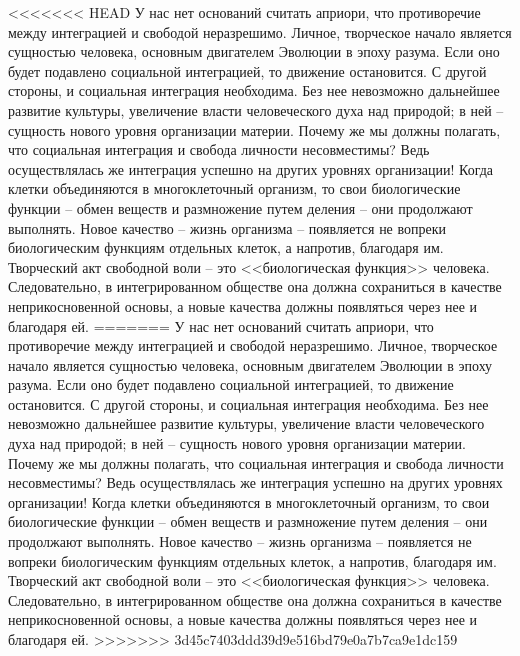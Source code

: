 \documentclass{book}
\begin{document}
<<<<<<< HEAD
У нас нет оснований считать априори, что противоречие между интеграцией и свободой неразрешимо. Личное, творческое начало является сущностью человека, основным двигателем Эволюции в эпоху разума. Если оно будет подавлено социальной интеграцией, то движение остановится. С другой стороны, и социальная интеграция необходима. Без нее невозможно дальнейшее развитие культуры, увеличение власти человеческого духа над природой; в ней -- сущность нового уровня организации материи. Почему же мы должны полагать, что социальная интеграция и свобода личности несовместимы? Ведь осуществлялась же интеграция успешно на других уровнях организации! Когда клетки объединяются в многоклеточный организм, то свои биологические функции -- обмен веществ и размножение путем деления -- они продолжают выполнять. Новое качество -- жизнь организма -- появляется не вопреки биологическим функ­циям отдельных клеток, а напротив, благодаря им. Творческий акт свободной воли -- это <<биологическая функция>> человека. Следовательно, в интегрированном обществе она должна сохраниться в качестве неприкосновенной основы, а новые ка­чества должны появляться через нее и благодаря ей.
=======
У нас нет оснований считать априори, что противоречие между интеграцией и свободой неразрешимо. Личное, творческое начало является сущностью человека, основным двигателем Эволюции в эпоху разума. Если оно будет подавлено социальной интеграцией, то движение остановится. С другой стороны, и социальная интеграция необходима. Без нее невозможно дальнейшее развитие культуры, увеличение власти человеческого духа над природой; в ней -- сущность нового уровня организации материи. Почему же мы должны полагать, что социальная интеграция и свобода личности несовместимы? Ведь осуществлялась же интеграция успешно на других уровнях организации! Когда клетки объединяются в многоклеточный организм, то свои биологические функции -- обмен веществ и размножение путем деления -- они продолжают выполнять. Новое качество -- жизнь организма -- появляется не вопреки биологическим функ­циям отдельных клеток, а напротив, благодаря им. Творческий акт свободной воли -- это <<биологическая функция>> человека. Следовательно, в 
интегрированном обществе она должна сохраниться в качестве неприкосновенной основы, а новые ка­чества должны появляться через нее и благодаря ей.
>>>>>>> 3d45c7403ddd39d9e516bd79e0a7b7ca9e1dc159
\end{document}
